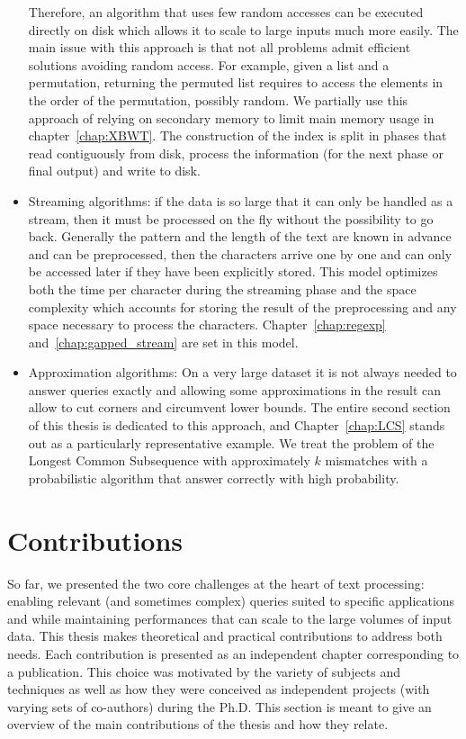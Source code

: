 \begin{itemize}
Therefore, an algorithm that uses few random accesses can be executed directly on disk which allows it to scale to large inputs much more easily. The main issue with this approach is that not all problems admit efficient solutions avoiding random access. For example, given a list and a permutation, returning the permuted list requires to access the elements in the order of the permutation, possibly random. We partially use this approach of relying on secondary memory to limit main memory usage in chapter~\ref{chap:XBWT}. The construction of the index is split in phases that read contiguously from disk, process the information (for the next phase or final output) and write to disk.
\item Streaming algorithms: if the data is so large that it can only be handled as a stream, then it must be processed on the fly without the possibility to go back. Generally the pattern and the length of the text are known in advance and can be preprocessed, then the characters arrive one by one and can only be accessed later if they have been explicitly stored. This model optimizes both the time per character during the streaming phase and the space complexity which accounts for storing the result of the preprocessing and any space necessary to process the characters. Chapter~\ref{chap:regexp} and~\ref{chap:gapped_stream} are set in this model.
\item Approximation algorithms: On a very large dataset it is not always needed to answer queries exactly and allowing some approximations in the result can allow to cut corners and circumvent lower bounds. 
The entire second section of this thesis is dedicated to this approach, and Chapter~\ref{chap:LCS} stands out as a particularly representative example. We treat the problem of the Longest Common Subsequence with approximately $k$ mismatches with a probabilistic algorithm that answer correctly with high probability. %
\end{itemize}

\section{Contributions}\label{intro:sec:contrib}

So far, we presented the two core challenges at the heart of text processing: enabling relevant (and sometimes complex) queries suited to specific applications and while maintaining performances that can scale to the large volumes of input data.
%
This thesis makes theoretical and practical contributions to address both needs. 
Each contribution is presented as an independent chapter corresponding to a publication. This choice was motivated by the variety of subjects and techniques as well as how they were conceived as independent projects (with varying sets of co-authors) during the Ph.D. This section is meant to give an overview of the main contributions of the thesis and how they relate.

